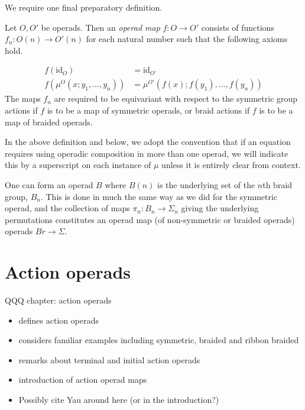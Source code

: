 \documentclass{amsbook} %
\newcommand{\id}{\textrm{id}}
\numberwithin{section}{chapter}
\begin{document}
We require one final preparatory definition.

\begin{Defi}
Let $O,O'$ be operads.  Then an \textit{operad map} $f \colon O \rightarrow O'$ consists of functions $f_{n} \colon O(n) \rightarrow O'(n)$ for each natural number such that the following axioms hold.

  \begin{align*}
    f\left(\id_O\right) &= \id_{O'}\\
    f\left(\mu^{O}(x;y_1,\ldots,y_n)\right) &= \mu^{O'}\left(f(x);f(y_1),\ldots,f(y_n)\right)
  \end{align*}
The maps $f_{n}$ are required to be equivariant with respect to the symmetric group actions if $f$ is to be a map of symmetric operads, or braid actions if $f$ is to be a map of braided operads.
\end{Defi}

\begin{conv}
In the above definition and below, we adopt the convention that if an equation requires using operadic composition in more than one operad, we will indicate this by a superscript on each instance of $\mu$ unless it is entirely clear from context.
\end{conv}

\begin{example}
One can form an operad $B$ where $B(n)$ is the underlying set of the $n$th braid group, $B_{n}$.  This is done in much the same way as we did for the symmetric operad, and the collection of maps $\pi_{n} \colon B_{n} \rightarrow \Sigma_{n}$ giving the underlying permutations constitutes an operad map (of non-symmetric or braided operads) operads $Br \rightarrow \Sigma$.
\end{example}

\section{Action operads}

 	QQQ chapter: action operads
 	\begin{itemize}
 		\item defines action operads 
 		\item considers familiar examples including symmetric, braided and ribbon braided
 		\item remarks about terminal and initial action operads
 		\item introduction of action operad maps
    \item Possibly cite Yau around here (or in the introduction?)
 	\end{itemize}
\end{document}
